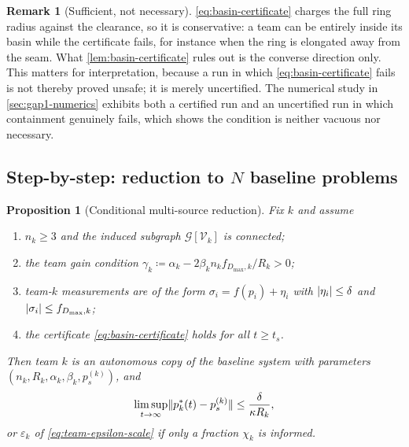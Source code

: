 \documentclass[11pt,a4paper]{article}
\theoremstyle{plain}
\newtheorem{proposition}{Proposition}
\theoremstyle{definition}
\newtheorem{remark}{Remark}
\newcommand{\V}{\mathcal{V}}
\newcommand{\G}{\mathcal{G}}
\DeclarePairedDelimiter{\norm}{\lVert}{\rVert}
\DeclarePairedDelimiter{\abs}{\lvert}{\rvert}
\begin{document}
\begin{remark}[Sufficient, not necessary]\label{rem:basin-sufficiency}
\eqref{eq:basin-certificate} charges the full ring radius against the clearance, so it is
conservative: a team can be entirely inside its basin while the certificate fails, for instance
when the ring is elongated away from the seam. What \cref{lem:basin-certificate} rules out is the
converse direction only. This matters for interpretation, because a run in which
\eqref{eq:basin-certificate} fails is not thereby proved unsafe; it is merely uncertified. The
numerical study in \cref{sec:gap1-numerics} exhibits both a certified run and an uncertified run
in which containment genuinely fails, which shows the condition is neither vacuous nor
necessary.
\end{remark}

\subsection{Step-by-step: reduction to $N$ baseline problems}\label{sec:gap1-reduction}

\begin{proposition}[Conditional multi-source reduction]\label{prop:multisource-reduction}
Fix $k$ and assume
\begin{enumerate}[label=(\alph*),nosep]
    \item $n_k\geq3$ and the induced subgraph $\G[\V_k]$ is connected;
    \item the team gain condition
    $\gamma_k\coloneqq\alpha_k-2\beta_kn_kf_{D_{\max},k}/R_k>0$;
    \item team-$k$ measurements are of the form $\sigma_i=f(p_i)+\eta_i$ with
    $\abs{\eta_i}\leq\delta$ and $\abs{\sigma_i}\leq f_{D_{\max},k}$;
    \item the certificate \eqref{eq:basin-certificate} holds for all $t\geq t_s$.
\end{enumerate}
Then team $k$ is an autonomous copy of the baseline system with parameters
$(n_k,R_k,\alpha_k,\beta_k,p_s^{(k)})$, and
\begin{equation}\label{eq:team-ultimate-bound}
    \limsup_{t\to\infty}\norm{p_k^*(t)-p_s^{(k)}}\leq\frac{\delta}{\kappa R_k},
\end{equation}
or $\varepsilon_k$ of \eqref{eq:team-epsilon-scale} if only a fraction $\chi_k$ is informed.
\end{proposition}
\end{document}
